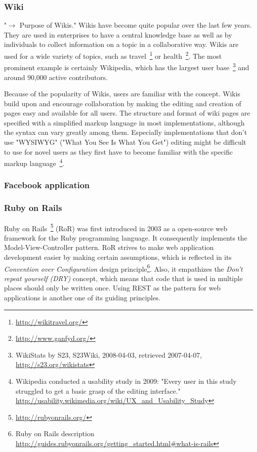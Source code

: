 \subsubsection{Wiki}
"$\rightarrow$ Purpose of Wikis." Wikis have become quite popular over the last few years. They are used in enterprises to have a central knowledge base as well as by individuals to collect information on a topic in a collaborative way. Wikis are used for a wide variety of topics, such as travel~\footnote{\url{http://wikitravel.org/}} or health~\footnote{\url{http://www.ganfyd.org/}}. The most prominent example is certainly Wikipedia, which has the largest user base~\footnote{WikiStats by S23, S23Wiki, 2008-04-03, retrieved 2007-04-07, \url{http://s23.org/wikistats}} and around 90,000 active contributors.

Because of the popularity of Wikis, users are familiar with the concept. Wikis build upon and encourage collaboration by making the editing and creation of pages easy and available for all users. The structure and format of wiki pages are specified with a simplified markup language in most implementations, although the syntax can vary greatly among them. Especially implementations that don't use "WYSIWYG" ("What You See Is What You Get") editing might be difficult to use for novel users as they first have to become familiar with the specific markup language~\footnote{Wikipedia conducted a usability study in 2009: "Every user in this study struggled to get a basic grasp of the editing interface." \url{http://usability.wikimedia.org/wiki/UX_and_Usability_Study}}. 

\subsubsection{Facebook application}



\subsubsection{Ruby on Rails}
Ruby on Rails~\footnote{\url{http://rubyonrails.org/}} (RoR) was first introduced in 2003 as a open-source web framework for the Ruby programming language. It consequently implements the Model-View-Controller pattern. 
RoR strives to make web application development easier by making certain assumptions, which is reflected in its \textit{Convention over Configuration} design principle\footnote{Ruby on Rails description \url{http://guides.rubyonrails.org/getting_started.html#what-is-rails}}. Also, it empathizes the \textit{Don't repeat yourself (DRY)} concept, which means that code that is used in multiple places should only be written once. 
Using REST as the pattern for web applications is another one of its guiding principles.

